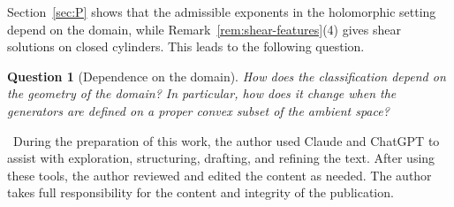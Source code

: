 \documentclass[a4paper, reqno, 11pt]{amsart}
\newtheorem{Que}[Thm]{Question}
\theoremstyle{definition}
\begin{document}
Section~\ref{sec:P} shows that the admissible exponents in the holomorphic setting depend on the domain, while Remark~\ref{rem:shear-features}(4) gives shear solutions on closed cylinders.
This leads to the following question.

\begin{Que}[Dependence on the domain]\label{que:domain}
How does the classification depend on the geometry of the domain?
In particular, how does it change when the generators are defined on a proper convex subset of the ambient space?
\end{Que}

\vspace{1pc}


 \ During the preparation of this work, the author used Claude and ChatGPT to assist with exploration, structuring, drafting, and refining the text. 
After using these tools, the author reviewed and edited the content as needed. 
The author takes full responsibility for the content and integrity of the publication. 



\end{document}
